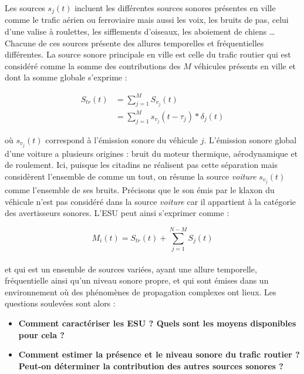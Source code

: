 Les sources $s_j(t)$ incluent les différentes sources sonores présentes en ville comme le trafic aérien ou ferroviaire mais aussi les voix, les bruits de pas, celui d'une valise à roulettes, les sifflements d'oiseaux, les aboiement de chiens \dots{} Chacune de ces sources présente des allures temporelles et fréquentielles différentes. La source sonore principale en ville est celle du trafic routier qui est considéré comme la somme des contributions des $M$ véhicules présents en ville et dont la somme globale s'exprime :

\begin{subequations}
\begin{align}
S_{tr}(t) &= \sum_{j = 1}^M S_{v_j}(t)\\
 & = \sum_{j = 1}^M s_{v_j}(t-\tau_j) \ast \delta_{j}(t)
\end{align}
\end{subequations}

où $s_{v_j}(t)$ correspond à l'émission sonore du véhicule $j$. L'émission sonore global d'une voiture a plusieurs origines : bruit du moteur thermique, aérodynamique et de roulement. Ici, puisque les citadins ne réalisent pas cette séparation mais considèrent l'ensemble de comme un tout, on résume la source \textit{voiture} $s_{v_j}(t)$ comme l'ensemble de ses bruits. Précisons que le son émis par le klaxon du véhicule n'est pas considéré dans la source \textit{voiture} car il appartient à la catégorie des avertisseurs sonores.
L'ESU peut ainsi s'exprimer comme : 

\begin{equation}
M_i(t) = S_{tr}(t)+\sum_{j = 1}^{N-M}S_j(t)
\end{equation}
\\

et qui est un ensemble de sources variées, ayant une allure temporelle, fréquentielle ainsi qu'un niveau sonore propre, et qui sont émises dans un environnement où des phénomènes de propagation complexes ont lieux. Les questions soulevées sont alors : 
 
\begin{itemize}
\item \textbf{Comment caractériser les ESU ? Quels sont les moyens disponibles pour cela ?}
\item \textbf{Comment estimer la présence et le niveau sonore du trafic routier ? Peut-on déterminer la contribution des autres sources sonores ?}\\
\end{itemize}

